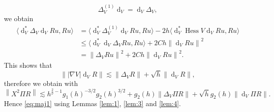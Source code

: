 \documentclass[12pt]{amsart}
\newcommand{\Hess}{\operatorname{Hess}}
\def\<{\langle}
\def\>{\rangle}
\renewcommand{\d}{\operatorname{d}}
\numberwithin{equation}{section}
\numberwithin{figure}{section}
\newcommand{\vvert}[1]{\left\lVert#1\right\rVert}
\begin{document}
\begin{equation*}
\Delta_V^{(1)}\d_V = \d_V\Delta_V,
\end{equation*}
we obtain
\begin{equation*}
\begin{aligned}
    \<\d_V^*\Delta_V\d_VRu,Ru\> &= \<\d_V^*\Delta_V^{(1)}\d_VRu,Ru\> - 2h\<\d_V^*\Hess V\d_VRu,Ru\>\\
    &\leq \<\d_V^*\d_V\Delta_VRu,Ru\> + 2Ch\vvert{\d_VRu}^2\\
    &= \vvert{\Delta_VRu}^2 + 2Ch\vvert{\d_VRu}^2.
\end{aligned}
\end{equation*}
This shows that
\begin{equation}\label{eq:pVdVR}
\vvert{|\nabla V|\d_VR} \lesssim \vvert{\Delta_VR} + \sqrt{h}\vvert{\d_VR},
\end{equation}
therefore we obtain with
\begin{equation*}
\vvert{X^2\Pi R} \lesssim h^{\frac{2}{\overline{\nu}} - 1}g_1(h)^{-3/2}g_2(h)^{3/2} + g_2(h)\vvert{\Delta_V\Pi R} + \sqrt hg_2(h)\vvert{\d_V \Pi R}.
\end{equation*}
Hence \eqref{eq:maj1} using Lemmas \ref{lem:1}, \ref{lem:3} and \ref{lem:4}.
\end{document}
